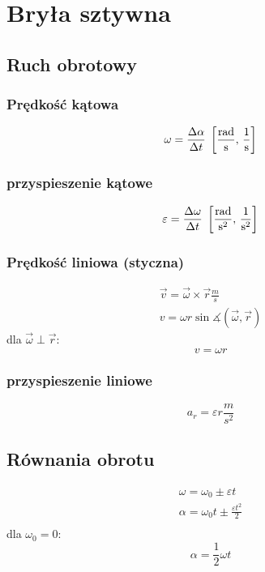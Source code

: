 \chapter{Bryła sztywna}

\section{Ruch obrotowy}

\subsection{Prędkość kątowa}
\begin{equation}
  \omega = \frac{\Delta \alpha}{\Delta t} \;\left[\mathrm{\frac{rad}{s}},\,\mathrm{\frac 1 s}\right]
\end{equation}

\subsection{przyspieszenie kątowe}
\begin{equation}
  \varepsilon = \frac{\Delta \omega}{\Delta t} \;\left[\mathrm{\frac{rad}{s^2}},\,\mathrm{\frac{1}{s^2}}\right]
\end{equation}

\subsection{Prędkość liniowa (styczna)}
\begin{gather*}
  \vec v = \vec \omega \times \vec r \unit{\frac m s}\\
  v = \omega r \sin\measuredangle(\vec \omega, \vec r)
\end{gather*}
dla $\vec \omega \perp \vec r$:
\begin{equation*}
  v = \omega r
\end{equation*}

\subsection{przyspieszenie liniowe}
\begin{equation}
  a_r = \varepsilon r \unit{\frac{m}{s^2}}
\end{equation}

\section{Równania obrotu}

\begin{gather*}
  \omega = \omega_0 \pm \varepsilon t\\
  \alpha = \omega_0 t \pm \frac{\varepsilon t^2}{2}\\
\end{gather*}
dla $\omega_0 = 0$:
\begin{equation*}
  \alpha = \frac 1 2 \omega t
\end{equation*}

